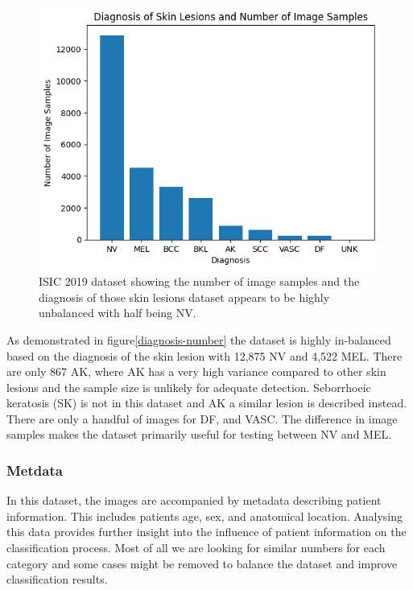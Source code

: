 \begin{figure}
	\centering
	\includegraphics[scale=0.75]{images/ISIC/diagnosis-number.png}
	\caption{ISIC 2019 dataset showing the number of image samples and the diagnosis of those skin lesions dataset appears to be highly unbalanced with half being NV.}
\end{figure}\label{diagnosis-number}

As demonstrated in figure\ref{diagnosis-number} the dataset is highly in-balanced based on the diagnosis of the skin lesion with 12,875 NV and 4,522 MEL. There are only 867 AK, where AK has a very high variance compared to other skin lesions and the sample size is unlikely for adequate detection. Seborrhoeic keratosis (SK) is not in this dataset and AK a similar lesion is described instead. There are only a handful of images for DF, and VASC. The difference in image samples makes the dataset primarily useful for testing between NV and MEL.

\subsubsection{Metdata}
In this dataset, the images are accompanied by metadata describing patient information. This includes patients age, sex, and anatomical location. Analysing this data provides further insight into the influence of patient information on the classification process. Most of all we are looking for similar numbers for each category and some cases might be removed to balance the dataset and improve classification results.

